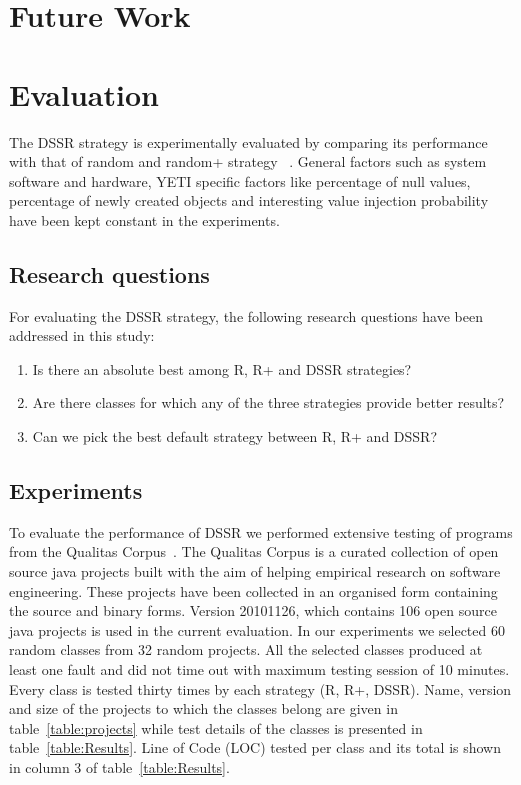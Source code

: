 \documentclass{acm_proc_article-sp}
\begin{document}
\section{Future Work}









\section{Evaluation}\label{sec:eval}

The DSSR strategy is experimentally evaluated by comparing its performance with that of random and random+ strategy ~\cite{Leitner2007}. General factors such as system software and hardware, YETI specific factors like percentage of null values, percentage of newly created objects and interesting value injection probability have been kept constant in the experiments.

\subsection{Research questions}
For evaluating the DSSR strategy, the following research questions have been addressed in this study:
\begin{enumerate}
\item Is there an absolute best among R, R+ and DSSR strategies?
\item Are there classes for which any of the three strategies provide better results?
\item Can we pick the best default strategy between R, R+ and DSSR?
\end{enumerate}



\subsection{Experiments}

To evaluate the performance of DSSR we performed extensive testing of programs from the Qualitas Corpus~\cite{Tempero2010a}. The Qualitas Corpus is a curated collection of open source java projects built with the aim of helping empirical research on  software engineering. These projects have been collected in an organised form containing the source and binary forms. Version 20101126, which contains 106 open source java projects is used in the current evaluation. In our experiments we selected 60 random classes from 32 random projects. All the selected classes produced at least one fault and did not time out with maximum testing session of 10 minutes. Every class is tested thirty times by each strategy (R, R+, DSSR). Name, version and size of the projects to which the classes belong are given in table~\ref{table:projects} while test details of the classes is presented in table~\ref{table:Results}. Line of Code (LOC) tested per class and its total is shown in column 3 of table~\ref{table:Results}. 
\end{document}
